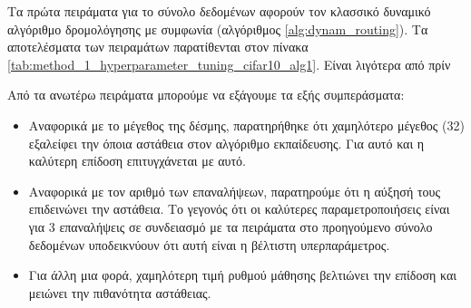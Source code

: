 Τα πρώτα πειράματα για το σύνολο δεδομένων  αφορούν τον κλασσικό δυναμικό αλγόριθμο δρομολόγησης με συμφωνία (αλγόριθμος \ref{alg:dynam_routing}). Τα αποτελέσματα των πειραμάτων παρατίθενται στον πίνακα \ref{tab:method_1_hyperparameter_tuning_cifar10_alg1}. Είναι λιγότερα από πρίν
\begin{table}[h]
    \begin{center}
    \end{center}
    \caption[]{\label{tab:method_1_hyperparameter_tuning_cifar10_alg1}Πειράματα στο  για την αναζήτηση υπερπαραμέτρων στον αλγόριθμο δυναμικής δρομολόγησης με συμφωνία (αλγόριθμος \ref{alg:dynam_routing}) για 30 εποχές. Οι αριθμοί με αστερίσκο αναφέρονται σε περιπτώσεις αστάθειας του αλγορίθμου εκπαίδευσης.}
\end{table}

Από τα ανωτέρω πειράματα μπορούμε να εξάγουμε τα εξής συμπεράσματα:
\begin{itemize}
    \item Αναφορικά με το μέγεθος της δέσμης, παρατηρήθηκε ότι χαμηλότερο μέγεθος (32) εξαλείφει την όποια αστάθεια στον αλγόριθμο εκπαίδευσης. Για αυτό και η καλύτερη επίδοση επιτυγχάνεται με αυτό.
    \item Αναφορικά με τον αριθμό των επαναλήψεων, παρατηρούμε ότι η αύξησή τους επιδεινώνει την αστάθεια. Το γεγονός ότι οι καλύτερες παραμετροποιήσεις είναι για 3 επαναλήψεις σε συνδειασμό με τα πειράματα στο προηγούμενο σύνολο δεδομένων υποδεικνύουν ότι αυτή είναι η βέλτιστη υπερπαράμετρος.
    \item Για άλλη μια φορά, χαμηλότερη τιμή ρυθμού μάθησης βελτιώνει την επίδοση και μειώνει την πιθανότητα αστάθειας.
\end{itemize}


